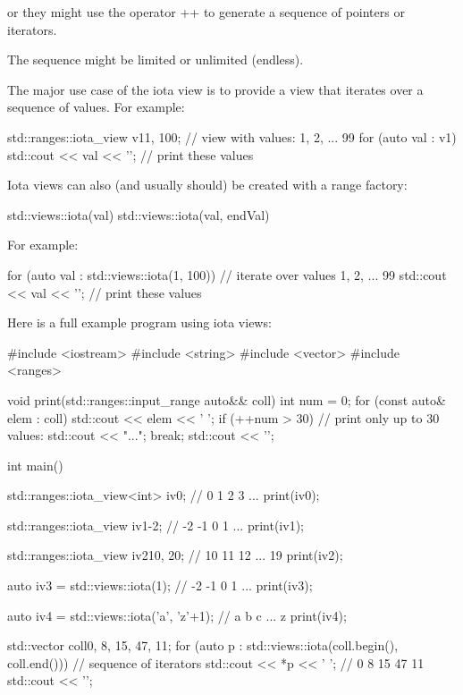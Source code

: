 or they might use the operator ++ to generate a sequence of pointers or iterators.

The sequence might be limited or unlimited (endless).

The major use case of the iota view is to provide a view that iterates over a sequence of values. For example:

\begin{cpp}
std::ranges::iota_view v1{1, 100}; // view with values: 1, 2, ... 99
for (auto val : v1) {
	std::cout << val << '\n'; // print these values
}
\end{cpp}


Iota views can also (and usually should) be created with a range factory:

\begin{cpp}
std::views::iota(val)
std::views::iota(val, endVal)
\end{cpp}

For example:

\begin{cpp}
for (auto val : std::views::iota(1, 100)) { // iterate over values 1, 2, ... 99
	std::cout << val << '\n'; // print these values
}
\end{cpp}

Here is a full example program using iota views:


\begin{cpp}
#include <iostream>
#include <string>
#include <vector>
#include <ranges>

void print(std::ranges::input_range auto&& coll)
{
	int num = 0;
	for (const auto& elem : coll) {
		std::cout << elem << ' ';
		if (++num > 30) { // print only up to 30 values:
			std::cout << "...";
			break;
		}
	}
	std::cout << '\n';
}

int main()
{
	std::ranges::iota_view<int> iv0; // 0 1 2 3 ...
	print(iv0);
	
	std::ranges::iota_view iv1{-2}; // -2 -1 0 1 ...
	print(iv1);
	
	std::ranges::iota_view iv2{10, 20}; // 10 11 12 ... 19
	print(iv2);
	
	auto iv3 = std::views::iota(1); // -2 -1 0 1 ...
	print(iv3);
	
	auto iv4 = std::views::iota('a', 'z'+1); // a b c ... z
	print(iv4);
	
	std::vector coll{0, 8, 15, 47, 11};
	for (auto p : std::views::iota(coll.begin(), coll.end())) { // sequence of iterators
		std::cout << *p << ' '; // 0 8 15 47 11
	}
	std::cout << '\n';
}
\end{cpp}

